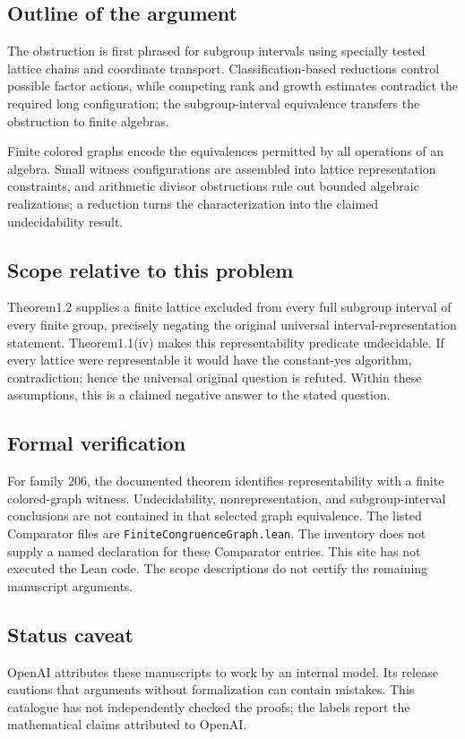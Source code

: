 \documentclass[11pt]{article}
\begin{document}
\subsection{Outline of the argument}
The obstruction is first phrased for subgroup intervals using specially tested lattice chains and coordinate transport. Classification-based reductions control possible factor actions, while competing rank and growth estimates contradict the required long configuration; the subgroup-interval equivalence transfers the obstruction to finite algebras.

Finite colored graphs encode the equivalences permitted by all operations of an algebra. Small witness configurations are assembled into lattice representation constraints, and arithmetic divisor obstructions rule out bounded algebraic realizations; a reduction turns the characterization into the claimed undecidability result.

\subsection{Scope relative to this problem}
Theorem1.2 supplies a finite lattice excluded from every full subgroup interval of every finite group, precisely negating the original universal interval-representation statement. Theorem1.1(iv) makes this representability predicate undecidable. If every lattice were representable it would have the constant-yes algorithm, contradiction; hence the universal original question is refuted. Within these assumptions, this is a claimed negative answer to the stated question.

\subsection{Formal verification}
For family 206, the documented theorem identifies representability with a finite colored-graph witness. Undecidability, nonrepresentation, and subgroup-interval conclusions are not contained in that selected graph equivalence. The listed Comparator files are \texttt{FiniteCongruenceGraph.lean}. The inventory does not supply a named declaration for these Comparator entries. This site has not executed the Lean code. The scope descriptions do not certify the remaining manuscript arguments.

\subsection{Status caveat}
OpenAI attributes these manuscripts to work by an internal model. Its release cautions that arguments without formalization can contain mistakes. This catalogue has not independently checked the proofs; the labels report the mathematical claims attributed to OpenAI.
\end{document}
